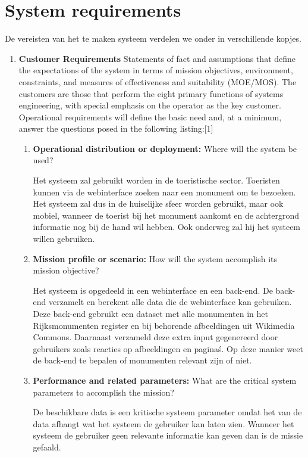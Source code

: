 \documentclass{article}
\begin{document}
\section{System requirements}
De vereisten van het te maken systeem verdelen we onder in verschillende kopjes.
\begin{enumerate}
	
	\item{\textbf{Customer Requirements}}
	Statements of fact and assumptions that define the expectations of the system in terms of mission objectives, environment, constraints, and measures of effectiveness and suitability (MOE/MOS). The customers are those that perform the eight primary functions of systems engineering, with special emphasis on the operator as the key customer. Operational requirements will define the basic need and, at a minimum, answer the questions posed in the following listing:[1]
	\begin{enumerate}
		\item{\textbf{Operational distribution or deployment:}} Where will the system be used?
		
		Het systeem zal gebruikt worden in de toeristische sector. Toeristen kunnen via de webinterface zoeken naar een monument om te bezoeken. Het systeem zal dus in de huiselijke sfeer worden gebruikt, maar ook mobiel, wanneer de toerist bij het monument aankomt en de achtergrond informatie nog bij de hand wil hebben. Ook onderweg zal hij het systeem willen gebruiken.
		\item{\textbf{Mission profile or scenario:}} How will the system accomplish its mission objective? 
		
		Het systeem is opgedeeld in een webinterface en een back-end. De back-end verzamelt en berekent alle data die de webinterface kan gebruiken. Deze back-end gebruikt een dataset met alle monumenten in het Rijksmonumenten register en bij behorende afbeeldingen uit Wikimedia Commons. Daarnaast verzameld deze extra input gegenereerd door gebruikers zoals reacties op afbeeldingen en pagina\'s. Op deze manier weet de back-end te bepalen of monumenten relevant zijn of niet. 
		
		\item{\textbf{Performance and related parameters:}} What are the critical system parameters to accomplish the mission?
		
		De beschikbare data is een kritische systeem parameter omdat het van de data afhangt wat het systeem de gebruiker kan laten zien. Wanneer het systeem de gebruiker geen relevante informatie kan geven dan is de missie gefaald.
		

\end{enumerate}
\end{enumerate}
\end{document}
